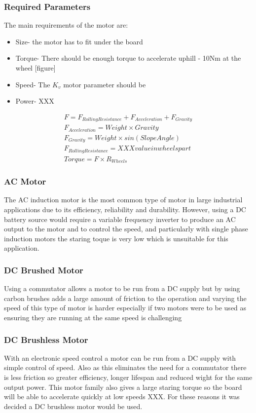 \documentclass[journal,10pt]{IEEEtran}
\begin{document}
        \subsubsection{Required Parameters}
        The main requirements of the motor are:
        \begin{itemize}
        	\item Size- the motor has to fit under the board
        	\item Torque- There should be enough torque to accelerate uphill - 10Nm at the wheel [figure]
        	\item Speed- The $K_{v}$ motor parameter should be 
        	\item Power- XXX
        \end{itemize}
        \begin{gather*}
            F = F_{Rolling Resistance} + F_{Acceleration} + F_{Gravity}
            \\F_{Acceleration} = Weight \times Gravity
            \\F_{Gravity} = Weight \times sin(Slope  Angle)
            \\F_{Rolling Resistance} = XXX value in wheels part
            \\Torque = F \times R_{Wheels}
        \end{gather*}

        \subsubsection{AC Motor}
            The AC induction motor is the most common type of motor in large industrial applications due to its efficiency, reliability and durability. However, using a DC battery source would require a variable frequency inverter to produce an AC output to the motor and to control the speed, and particularly with single phase induction motors the staring toque is very low which is unsuitable for this application. 
        \subsubsection{DC Brushed Motor}
            Using a commutator allows a motor to be run from a DC supply but by using carbon brushes adds a large amount of friction to the operation and varying the speed of this type of motor is harder especially if two motors were to be used as ensuring they are running at the same speed is challenging
        \subsubsection{DC Brushless Motor}
            With an electronic speed control a motor can be run from a DC supply with simple control of speed. Also as this eliminates the need for a commutator there is less friction so greater efficiency, longer lifespan and reduced wight for the same output power. This motor family also gives a large staring torque so the board will be able to accelerate quickly at low speeds XXX. For these reasons it was decided a DC brushless motor would be used.
\end{document}
